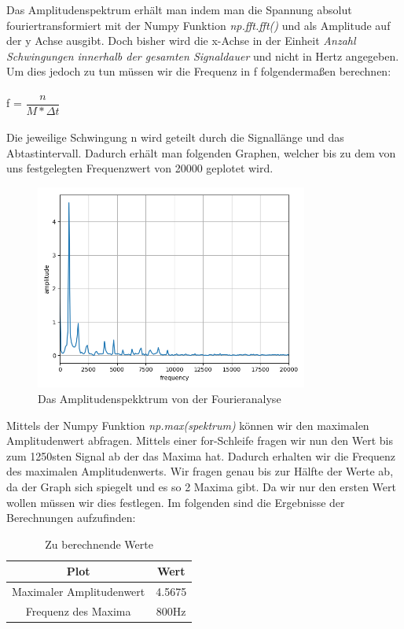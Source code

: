 \documentclass[12pt, oneside, a4paper, \docLanguage]{report}
\begin{document}
\newpage
Das Amplitudenspektrum erhält man indem man die Spannung absolut fouriertransformiert mit der Numpy Funktion \textit{np.fft.fft()} und als Amplitude auf der y Achse ausgibt. 
\newline
Doch bisher wird die x-Achse in der Einheit \textit{Anzahl Schwingungen innerhalb der gesamten Signaldauer} und nicht in Hertz angegeben. 
\newline
Um dies jedoch zu tun müssen wir die Frequenz in f folgendermaßen berechnen:
\\~\\
f = $\dfrac{n}{M * \Delta t}$
\\~\\
Die jeweilige Schwingung n wird geteilt durch die Signallänge und das Abtastintervall.
Dadurch erhält man folgenden Graphen, welcher bis zu dem von uns festgelegten Frequenzwert von 20000 geplotet wird.
\begin{figure}[H]
	\centering\small
	\includegraphics[width=0.8\textwidth]{../data/img/mundharmonika2.png}
	\caption{Das Amplitudenspekktrum von der Fourieranalyse}
	\label{img:Das Amplitudenspekktrum von der Fourieranalyse}
\end{figure}
\newpage
Mittels der Numpy Funktion \textit{np.max(spektrum)} können wir den maximalen Amplitudenwert abfragen.
Mittels einer for-Schleife fragen wir nun den Wert bis zum 1250sten Signal ab der das Maxima hat.
\newline 
Dadurch erhalten wir die Frequenz des maximalen Amplitudenwerts.
Wir fragen genau bis zur Hälfte der Werte ab, da der Graph sich spiegelt und es so 2 Maxima gibt. Da wir nur den ersten Wert wollen müssen wir dies festlegen.
\newline
Im folgenden sind die Ergebnisse der Berechnungen aufzufinden:
\begin{table}[H]
	\centering\small
	\begin{tabular}{|c|c|}
	\hline
	Plot & Wert \\
	\hline
	Maximaler Amplitudenwert & 4.5675 \\
	\hline
	Frequenz des Maxima & 800Hz \\
	\hline
	\end{tabular}
	\caption{Zu berechnende Werte}
	\label{fig:VERSUCH_1_MESSWERTE}
\end{table}
\newpage
\end{document}
